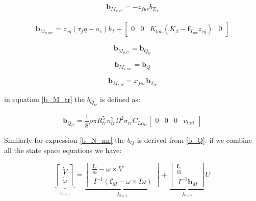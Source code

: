\begin{equation}
	\textbf{b}_{ M_{x,tr}}=-z_{fus}b_{T_{tr}}
\end{equation}

\begin{gather}
	\textbf{b}_{ M_{y,mr}}=z_{cg}(\tau_fq-a_v)b_T+ \begin{bmatrix}
		0&0&K_{lon}(K_{\beta}-\textbf{f}_{T_{mr}}z_{cg})&0
	\end{bmatrix} 
\end{gather}

\begin{equation}\label{b_M_tr}
	\textbf{b}_{ M_{y,tr}}=\textbf{b}_{Q_{tr}}
\end{equation}

\begin{equation}\label{b_N_mr}
	\textbf{b}_{ M_{z,mr}}=\textbf{b}_Q
\end{equation}

\begin{equation}
	\textbf{b}_{ M_{z,tr}}=x_{fus} \textbf{b}_{T_{tr}}
\end{equation}

in equation \ref{b_M_tr} the $b_{Q_{tr}}$ is defined as:

\begin{equation}
	\textbf{b}_{Q_{tr}}=\frac{1}{8} \rho \pi R_{tr}^5 n_{tr}^2 \Omega^2 \sigma_{tr} C_{L\alpha_{tr}}  \begin{bmatrix}
		0&
		0&
		0 &
		v_{tail}
	\end{bmatrix}  
\end{equation}

Similarly for expression \ref{b_N_mr} the $b_Q$ is derived from \ref{b_Q}. if we combine all the state space equations we have:

\begin{equation}\label{eq22}
	\underbrace{\left[
		\begin{array}{c}
			\dot{V} \\
			\hline
			\dot{\omega}
		\end{array}
		\right]
	}_{\dot{x} _{6\times 1}}
	=
	\underbrace{\left[
		\begin{array}{c}
			\frac{\textbf{f}_F}{m}-\omega \times V \\
			\hline
			\ I^{-1} (\textbf{f}_{M}-\omega \times I \omega)
		\end{array}
		\right]
	}_{f _{6\times 1}}
	+\underbrace{\left[
		\begin{array}{c}
			\frac{\textbf{f}_U}{m }\\
			\hline
			\ I^{-1} \textbf{b}_M
		\end{array}
		\right]
	}_{f _{6\times 4}} U
\end{equation}

